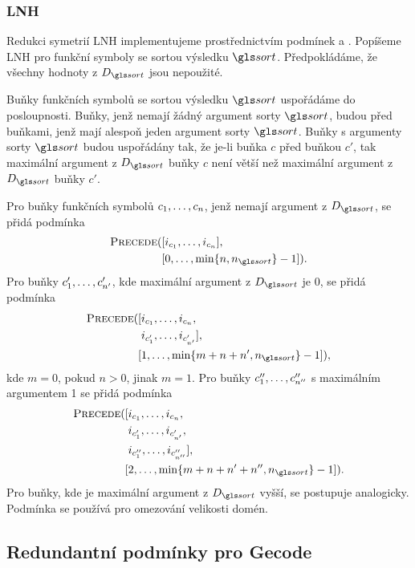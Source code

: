 {\subsubsection{LNH}

Redukci symetrií LNH implementujeme prostřednictvím podmínek
\LowerEq{} a \Precede{}. Popíšeme LNH pro funkční symboly
se sortou výsledku $\sort$. Před\-po\-klá\-dáme,
že všechny hodnoty z $D_\sort$ jsou nepoužité.

Buňky funkčních symbolů se sortou výsledku $\sort$
uspořádáme do posloupnosti.
Buňky, jenž nemají žádný argument sorty $\sort$, budou
před buňkami, jenž mají alespoň jeden
argument sorty $\sort$. Buňky s argumenty sorty $\sort$
budou uspořádány tak, že je-li buňka $c$
před buňkou $c'$, tak maximální argument z $D_\sort$ buňky $c$
není větší než maximální argument z $D_\sort$ buňky $c'$.

Pro buňky funkčních symbolů $c_1 , \ldots, c_n$,
jenž nemají argument z $D_\sort$,
se přidá podmínka
\[
\begin{split}
  \Precede([&i_{c_1} \comdots i_{c_n}], \\
           [&0 \comdots \min \{ n, n_\sort \} - 1]).
\end{split}
\]
Pro buňky $c'_1 , \ldots, c'_{n'}$, kde maximální argument z $D_\sort$
je 0, se přidá podmínka
\[
\begin{split}
  \Precede([&i_{c_1} \comdots i_{c_n}, \\
            &i_{c'_1} \comdots i_{c'_{n'}}], \\
           [&1 \comdots \min \{ m + n + n', n_\sort \} - 1]),
\end{split}
\]
kde $m = 0$, pokud $n > 0$, jinak $m = 1$.
Pro buňky $c''_1 , \ldots, c''_{n''}$ s maximálním argumentem
1 se přidá podmínka
\[
\begin{split}
  \Precede([&i_{c_1} \comdots i_{c_n},\\
            &i_{c'_1} \comdots i_{c'_{n'}},\\
            &i_{c''_1} \comdots i_{c''_{n''}}], \\
           [&2 \comdots \min \{ m + n + n' + n'', n_\sort \} - 1]).
\end{split}
\]
Pro buňky, kde je maximální argument z $D_\sort$ vyšší,
se postupuje analogicky. Podmínka \LowerEq{} se používá
pro omezování velikosti domén.

}


\subsection{Redundantní podmínky pro Gecode}

